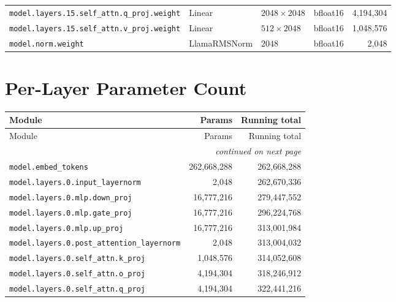 \documentclass[10pt,a4paper]{article}
\begin{document}
\begin{appendices}
{\begin{longtable}{p{6.8cm}>{\raggedright\arraybackslash}p{3.3cm}llr}
\texttt{model.\allowbreak{}layers.\allowbreak{}15.\allowbreak{}self\_attn.\allowbreak{}q\_proj.\allowbreak{}weight} & Linear & $2048 \times 2048$ & bfloat16 & 4,194,304 \\
\texttt{model.\allowbreak{}layers.\allowbreak{}15.\allowbreak{}self\_attn.\allowbreak{}v\_proj.\allowbreak{}weight} & Linear & $512 \times 2048$ & bfloat16 & 1,048,576 \\
\texttt{model.\allowbreak{}norm.\allowbreak{}weight} & Llama\allowbreak{}RMSNorm & $2048$ & bfloat16 & 2,048 \\
\end{longtable}
}
\section{Per-Layer Parameter Count}
\begin{longtable}{p{9.5cm}rr}
\toprule
Module & Params & Running total \\
\midrule
\endfirsthead
\toprule
Module & Params & Running total \\
\midrule
\endhead
\midrule \multicolumn{3}{r}{\textit{continued on next page}} \\
\endfoot
\bottomrule
\endlastfoot
\texttt{model.\allowbreak{}embed\_tokens} & 262,668,288 & 262,668,288 \\
\texttt{model.\allowbreak{}layers.\allowbreak{}0.\allowbreak{}input\_layernorm} & 2,048 & 262,670,336 \\
\texttt{model.\allowbreak{}layers.\allowbreak{}0.\allowbreak{}mlp.\allowbreak{}down\_proj} & 16,777,216 & 279,447,552 \\
\texttt{model.\allowbreak{}layers.\allowbreak{}0.\allowbreak{}mlp.\allowbreak{}gate\_proj} & 16,777,216 & 296,224,768 \\
\texttt{model.\allowbreak{}layers.\allowbreak{}0.\allowbreak{}mlp.\allowbreak{}up\_proj} & 16,777,216 & 313,001,984 \\
\texttt{model.\allowbreak{}layers.\allowbreak{}0.\allowbreak{}post\_attention\_layernorm} & 2,048 & 313,004,032 \\
\texttt{model.\allowbreak{}layers.\allowbreak{}0.\allowbreak{}self\_attn.\allowbreak{}k\_proj} & 1,048,576 & 314,052,608 \\
\texttt{model.\allowbreak{}layers.\allowbreak{}0.\allowbreak{}self\_attn.\allowbreak{}o\_proj} & 4,194,304 & 318,246,912 \\
\texttt{model.\allowbreak{}layers.\allowbreak{}0.\allowbreak{}self\_attn.\allowbreak{}q\_proj} & 4,194,304 & 322,441,216 \\

\end{longtable}
\end{appendices}
\end{document}

